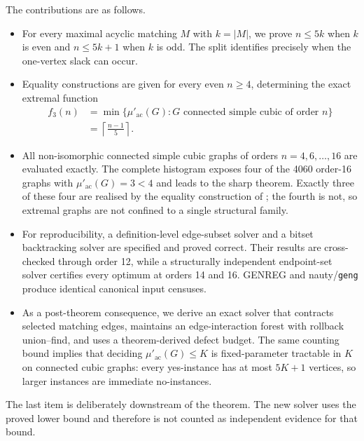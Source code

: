 \documentclass[smallextended,natbib,nospthms]{svjour3}
\theoremstyle{definition}
\theoremstyle{remark}
\newcommand{\acnum}{\mu'_{\mathrm{ac}}}
\newcommand{\ceil}[1]{\left\lceil #1\right\rceil}
\begin{document}
The contributions are as follows.
\begin{itemize}[leftmargin=1.5em]
  \item For every maximal acyclic matching $M$ with $k=|M|$, we prove
  $n\leq 5k$ when $k$ is even and $n\leq 5k+1$ when $k$ is odd. The split
  identifies precisely when the one-vertex slack can occur.

  \item Equality constructions are given for every even $n\geq 4$, determining
  the exact extremal function
  \[
    \begin{aligned}
      f_3(n)
      &=\min\bigl\{\acnum(G):
        G\text{ connected simple cubic of order }n\bigr\}\\
      &=\ceil{\frac{n-1}{5}}.
    \end{aligned}
  \]

  \item All non-isomorphic connected simple cubic graphs of orders
  $n=4,6,\ldots,16$ are evaluated exactly. The complete histogram exposes
  four of the 4060 order-16 graphs with $\acnum(G)=3<4$ and leads to the sharp
  theorem. Exactly three of these four are realised by the equality
  construction of ; the fourth is not, so extremal
  graphs are not confined to a single structural family.

  \item For reproducibility, a definition-level edge-subset solver and a bitset
  backtracking solver are specified and proved correct. Their results are
  cross-checked through order 12, while a structurally independent
  endpoint-set solver certifies every optimum at orders 14 and 16. GENREG and
  nauty/\texttt{geng} produce identical canonical input censuses.

  \item As a post-theorem consequence, we derive an exact solver that contracts
  selected matching edges, maintains an edge-interaction forest with rollback
  union--find, and uses a theorem-derived defect budget. The same counting
  bound implies that deciding $\acnum(G)\leq K$ is fixed-parameter tractable
  in $K$ on connected cubic graphs: every yes-instance has at most $5K+1$
  vertices, so larger instances are immediate no-instances.
\end{itemize}

The last item is deliberately downstream of the theorem. The new solver uses
the proved lower bound and therefore is not counted as independent evidence
for that bound.
\end{document}
